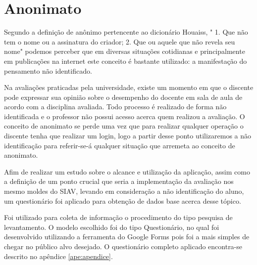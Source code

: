 \documentclass[12pt, a4paper]{report}
\begin{document}
\section{ Anonimato}
%
Segundo a definição de anônimo pertencente ao dicionário Houaiss, " 1. Que não tem o nome ou a assinatura do criador; 2. Que ou aquele que não revela seu nome" \cite[p. 7]{houasis2001} podemos perceber que em diversas situações cotidianas e principalmente em publicações na internet este conceito é bastante utilizado: a manifestação do pensamento não identificado.

Na avaliações praticadas pela universidade, existe um momento em que o discente pode expressar sua opinião sobre o desempenho do docente em sala de aula de acordo com a disciplina avaliada. Todo processo é realizado de forma não identificada e o professor não possui acesso acerca quem realizou a avaliação. O conceito de anonimato se perde uma vez que para realizar qualquer operação o discente tenha que realizar um login, logo a partir desse ponto utilizaremos a não identificação para referir-se-á qualquer situação que arremeta ao conceito de anonimato.

Afim de realizar um estudo sobre o alcance e utilização da aplicação, assim como a definição de um ponto crucial que seria a implementação da avaliação nos mesmo moldes do SIAV, levando em consideração a não identificação do aluno, um questionário foi aplicado para obtenção de dados base acerca desse tópico. %

Foi utilizado para coleta de informação o procedimento do tipo pesquisa de levantamento. O modelo escolhido foi do tipo Questionário, no qual foi desenvolvido utilizando a ferramenta do Google Forms pois foi a mais simples de chegar no público alvo desejado. O questionário completo aplicado encontra-se descrito no apêndice \ref{ape:apendice}.
\end{document}
